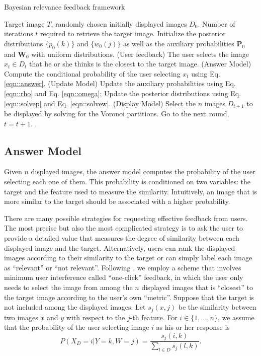 \documentclass[journal]{IEEEtran}
\begin{document}
\begin{algorithm}[ht]
\caption{Bayesian relevance feedback framework}
\label{alg::champ}
\begin{algorithmic} \renewcommand{\algorithmicrequire}{\textbf{Input:}} \renewcommand{\algorithmicensure}{\textbf{Output:}}
\REQUIRE
Target image $T$, randomly chosen initially displayed images $D_0$.
\ENSURE Number of iterations $t$ required to retrieve the target image.
\STATE Initialize the posterior distributions $\{p_0(k)\}$ and $\{w_0(j)\}$ as well as the auxiliary probabilities $\textbf{P}_0$ and $\textbf{W}_0$ with uniform distributions.
\REPEAT
\STATE (User feedback)
\STATE The user selects the image $x_t\in D_t$ that he or she thinks is the closest to the target image.
\STATE (Answer Model)
\STATE Compute the conditional probability of the user selecting $x_t$ using Eq. \eqref{eqn::answer}.
\STATE (Update Model)
\STATE Update the auxiliary probabilities using Eq. \eqref{eqn::rho} and Eq. \eqref{eqn::omega};
\STATE Update the posterior distributions using Eq. \eqref{eqn::solvep} and Eq. \eqref{eqn::solvew}.
\STATE (Display Model)
\STATE Select the $n$ images $D_{t+1}$ to be displayed by solving for the Voronoi partitions.
\STATE Go to the next round, $t=t+1$.
.
\end{algorithmic}
\end{algorithm}

\subsection{Answer Model}\label{answermodel}
Given $n$ displayed images, the answer model computes the probability of the user selecting each one of them. This probability is conditioned on two variables: the target and the feature used to measure the similarity. Intuitively, an image that is more similar to the target should be associated with a higher probability.

There are many possible strategies for requesting effective feedback from users. The most precise but also the most complicated strategy is to ask the user to provide a detailed value that measures the degree of similarity between each displayed image and the target. Alternatively, users can rank the displayed images according to their similarity to the target or can simply label each image as ``relevant'' or ``not relevant''. Following \cite{fang2005experiments}, we employ a scheme that involves minimum user interference called ``one-click'' feedback, in which the user only needs to select the image from among the $n$ displayed images that is ``closest'' to the target image according to the user's own ``metric''. Suppose that the target is not included among the displayed images. Let $s_j(x,j)$ be the similarity between two images $x$ and $y$ with respect to the $j$-th feature. For $i\in \{1,...,n\}$, we assume that the probability of the user selecting image $i$ as his or her response is
\begin{equation}\label{eqn::answer}
P(X_D=i|Y=k,W=j)=\frac{s_j(i,k)}{\sum_{l\in D}s_j(l,k)}.
\end{equation}
\end{document}
